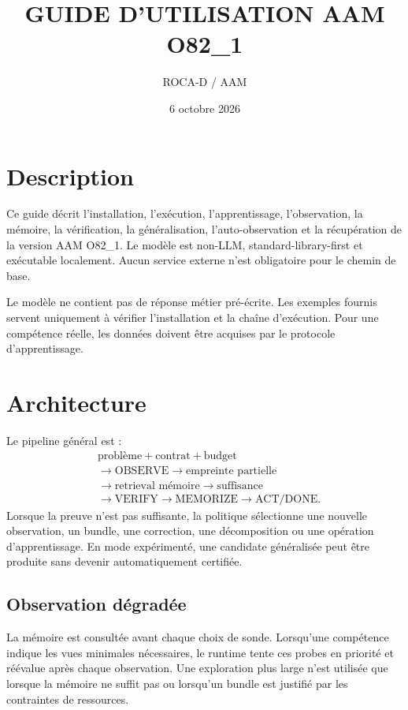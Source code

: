 \documentclass[11pt,a4paper]{report}
\title{GUIDE D'UTILISATION AAM O82\_1}
\author{ROCA-D / AAM}
\date{6 octobre 2026}
\begin{document}
\setlength{\emergencystretch}{2em}
\maketitle
\tableofcontents

\chapter{Description}
Ce guide décrit l'installation, l'exécution, l'apprentissage, l'observation, la mémoire, la vérification, la généralisation, l'auto-observation et la récupération de la version AAM O82\_1. Le modèle est non-LLM, standard-library-first et exécutable localement. Aucun service externe n'est obligatoire pour le chemin de base.

Le modèle ne contient pas de réponse métier pré-écrite. Les exemples fournis servent uniquement à vérifier l'installation et la chaîne d'exécution. Pour une compétence réelle, les données doivent être acquises par le protocole d'apprentissage.

\chapter{Architecture}
Le pipeline général est :
\begin{align*}
&\text{problème}+\text{contrat}+\text{budget}\\
&\rightarrow\text{OBSERVE}\rightarrow\text{empreinte partielle}\\
&\rightarrow\text{retrieval mémoire}\rightarrow\text{suffisance}\\
&\rightarrow\text{VERIFY}\rightarrow\text{MEMORIZE}\rightarrow\text{ACT/DONE}.
\end{align*}
Lorsque la preuve n'est pas suffisante, la politique sélectionne une nouvelle observation, un bundle, une correction, une décomposition ou une opération d'apprentissage. En mode expérimenté, une candidate généralisée peut être produite sans devenir automatiquement certifiée.

\section{Observation dégradée}
La mémoire est consultée avant chaque choix de sonde. Lorsqu'une compétence indique les vues minimales nécessaires, le runtime tente ces probes en priorité et réévalue après chaque observation. Une exploration plus large n'est utilisée que lorsque la mémoire ne suffit pas ou lorsqu'un bundle est justifié par les contraintes de ressources.
\end{document}
